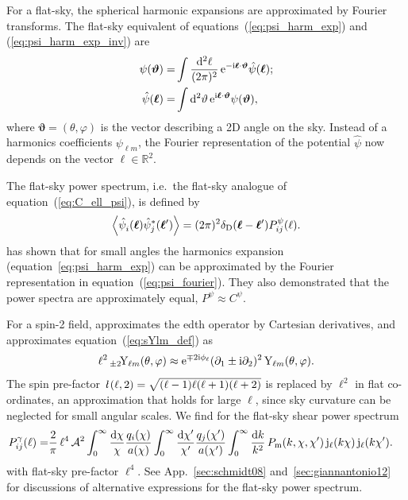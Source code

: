 \documentclass[fleqn,usenatbib]{mnras} %
\newcommand{\ellbar}{\hbox{\it \l}\,}
\newcommand{\pref}{{\cal A}}
\renewcommand{\vec}{\bm}
\begin{document}
For a flat-sky, the spherical harmonic expansions are approximated by Fourier
transforms. The flat-sky equivalent of equations~(\ref{eq:psi_harm_exp}) and
(\ref{eq:psi_harm_exp_inv}) are
%
\begin{align}
  \psi(\vec \vartheta) = & \int \frac{{\rm d}^2 \ell}{(2\pi)^2} \, {\rm e}^{-{\rm i} \vec \ell \cdot \vec \vartheta} \hat \psi(\vec \ell);
  \label{eq:psi_fourier}
  \\
  \hat \psi(\vec \ell) = & \int {\rm d}^2 \vartheta \, {\rm e}^{{\rm i} \vec \ell \cdot \vec \vartheta} \psi(\vec \vartheta),
  \label{eq:psi_fourier_inv}
\end{align}
%
where $\vec \vartheta = (\theta, \varphi)$ is the vector describing a 2D angle on the sky.
Instead of a harmonics coefficients $\psi_{\ell m}$, the Fourier representation of the potential
$\hat \psi$ now depends on the vector $\vec \ell \in \mathbb{R}^2$.

The flat-sky power spectrum, i.e.\ the flat-sky analogue of equation~(\ref{eq:C_ell_psi}), is defined by
%
\begin{equation}
  \left\langle \hat \psi_i^{}(\vec \ell) \hat \psi_j^\ast(\vec \ell^\prime) \right\rangle
    = (2\pi)^2 \delta_{\rm D}(\vec \ell - \vec \ell^\prime) P^\psi_{ij}(\ell).
  \label{eq:P_ell_psi}
\end{equation}
%
\cite{2000PhRvD..62d3007H} has shown that for small angles the harmonics
expansion (equation~\ref{eq:psi_harm_exp}) can be approximated by the Fourier
representation in equation~(\ref{eq:psi_fourier}). They also demonstrated that the power
spectra are approximately equal, $P^\psi \approx C^\psi$.

For a spin-2 field, \cite{2000PhRvD..62d3007H} approximates the edth operator
by Cartesian derivatives, and approximates equation~(\ref{eq:sYlm_def}) as
%
\begin{equation}
  \ell^2 \, _{\pm2}\!{\rm Y}_{\ell m}(\theta, \varphi) \approx  {\rm e}^{{\mp}2 {\rm i} \phi_\ell}
    (\partial_1 \pm {\rm i} \partial_2)^2 \, {\rm Y}_{\ell m}(\theta, \varphi).
  \label{eq:sYlm_def_flat}
\end{equation}
%
The spin pre-factor $\ellbar(\ell, 2) = \sqrt{(\ell-1) \ell (\ell+1) (\ell+2)}$
is replaced by $\ell^2$ in flat co-ordinates, an approximation that holds for
large $\ell$, since sky curvature can be neglected for small angular
scales. We find for the flat-sky shear power spectrum
%
\begin{align}
  P^\gamma_{ij}(\ell) 
                 = & \frac 2 \pi \, \ell^4 \, \pref^2
                 \int_{0}^\infty \frac{\rm d \chi}{\chi} \frac{q_i(\chi)}{a(\chi)}
                \int_{0}^\infty \frac{\rm d \chi^\prime}{\chi^\prime}
                \frac{q_j(\chi^\prime)}{a(\chi^\prime)}
                \int_0^\infty \frac{{\rm d} k}{k^2} \, P_{\rm m}(k, \chi, \chi^\prime) \,
                {\rm j}_\ell(k \chi) \, {\rm j}_\ell(k \chi^\prime) .
  \label{eq:P_ell_gamma_full_der}
\end{align}
%
with flat-sky pre-factor $\ell^4$. See App.~\ref{sec:schmidt08} and~\ref{sec:giannantonio12} for discussions of alternative expressions for the
flat-sky power spectrum.
\end{document}
